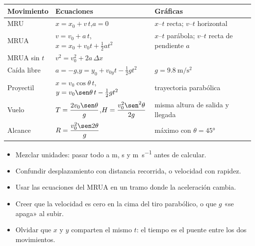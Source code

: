\documentclass[11pt,a4paper]{article}
\begin{document}
\clearpage
\repaso
\begin{center}
\begin{tabularx}{\linewidth}{@{}l >{\raggedright\arraybackslash}p{62mm} L@{}}
\toprule
Movimiento & Ecuaciones & Gráficas\\ \midrule
MRU & $x=x_0+v\,t$,\quad $a=0$ & $x$--$t$ recta; $v$--$t$ horizontal\\
MRUA & $v=v_0+a\,t$,\quad $x=x_0+v_0t+\tfrac12at^2$ & $x$--$t$ parábola; $v$--$t$ recta de pendiente $a$\\
MRUA sin $t$ & $v^2=v_0^2+2a\,\Delta x$ & \\
Caída libre & $a=-g$,\quad $y=y_0+v_{0y}t-\tfrac12gt^2$ & $g=\SI{9.8}{\meter\per\second\squared}$\\
Proyectil & $x=v_0\cos\theta\,t$,\quad $y=v_0\sen\theta\,t-\tfrac12gt^2$ & trayectoria parabólica\\
Vuelo & $T=\dfrac{2v_0\sen\theta}{g}$,\quad $H=\dfrac{v_0^2\sen^2\theta}{2g}$ & misma altura de salida y llegada\\
Alcance & $R=\dfrac{v_0^2\sen2\theta}{g}$ & máximo con $\theta=\ang{45}$\\
\bottomrule
\end{tabularx}
\end{center}

\begin{ojo}
\begin{itemize}
\item Mezclar unidades: pasar todo a \si{\meter}, \si{\second} y \si{\meter\per\second} antes de calcular.
\item Confundir desplazamiento con distancia recorrida, o velocidad con rapidez.
\item Usar las ecuaciones del MRUA en un tramo donde la aceleración cambia.
\item Creer que la velocidad es cero en la cima del tiro parabólico, o que $g$ «se apaga» al subir.
\item Olvidar que $x$ y $y$ comparten el mismo $t$: el tiempo es el puente entre los dos movimientos.
\end{itemize}
\end{ojo}
\end{document}
